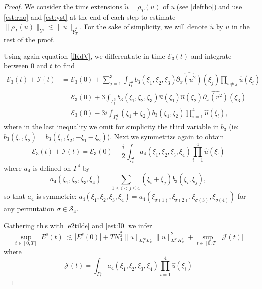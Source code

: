\documentclass{amsart}
\theoremstyle{definition}
\theoremstyle{remark}
\numberwithin{equation}{section}
\begin{document}
\begin{proof}
We consider the time extensions $\widetilde{u} = \rho_T(u)$ of $u$  (see \eqref{defrho}) and use \eqref{est:rho} and \eqref{est:yst} at the end of each step to estimate $\|\rho_{T}(u)\|_{Y^s} \lesssim\|u\|_{\widetilde{Y}^s_T} $.  For the sake of simplicity, we will denote $\widetilde{u}$ by $u$ in the rest of the proof. 

 Using again equation \eqref{fKdV}, we differentiate in time $\mathcal{E}_3(t)$ and integrate between $0$ and $t$ to find
\begin{align*}
\mathcal{E}_3(t) + \mathcal{I}(t) &= \mathcal{E}_3(0) + \sum_{j=1}^3 \int_{\Gamma^3_t} b_3(\xi_1,\xi_2,\xi_3) \widehat{\partial_x(u^2)}(\xi_j) \prod_{i\neq j}\widehat{u}(\xi_i) \\
&= \mathcal{E}_3(0) + 3\int_{\Gamma^3_t}b_3(\xi_1,\xi_2,\xi_3) \widehat{u}(\xi_1) \widehat{u}(\xi_2) \widehat{\partial_x(u^2)}(\xi_3) \\
&= \mathcal{E}_3(0) -3i\int_{\Gamma^4_t} (\xi_1+\xi_2)b_3(\xi_1,\xi_2) \prod_{i=1}^4 \widehat{u}(\xi_i),
\end{align*}
where in the last inequality we omit for simplicity the third variable in $b_3$ (ie: $b_3(\xi_1,\xi_2) = b_3(\xi_1,\xi_2,-\xi_1-\xi_2)$). Next we symmetrize again to obtain
$$
\mathcal{E}_3(t) + \mathcal{I}(t) = \mathcal{E}_3(0) -\frac i2 \int_{\Gamma^4_t} a_4(\xi_1,\xi_2,\xi_3,\xi_4) \prod_{i=1}^4 \widehat{u}(\xi_i)
$$
where $a_4$ is defined on $\Gamma^4$ by
$$
a_4(\xi_1,\xi_2,\xi_3,\xi_4) = \sum_{1 \le i<j \le 4} (\xi_i+\xi_j)b_3(\xi_i,\xi_j),
$$
so that $a_4$ is symmetric: $a_4(\xi_1,\xi_2,\xi_3,\xi_4) = a_4(\xi_{\sigma(1)}, \xi_{\sigma(2)}, \xi_{\sigma(3)}, \xi_{\sigma(4)})$ for any permutation $\sigma\in \mathcal{S}_4$. 

Gathering this with \eqref{e2tilde} and \eqref{est:I0} we infer
$$
\sup_{t\in[0,T]}|E^s(t)| \lesssim |E^s(0)| + T N_0^{\frac 32}\|u\|_{L^\infty_TL^2_x}\|u\|_{L^\infty_TH^s_x}^2 + \sup_{t\in[0,T]} |\mathcal{J}(t)|
$$
where 
\begin{equation} \label{def:J}
\mathcal{J}(t) =  \int_{\Gamma^4_t} a_4(\xi_1,\xi_2,\xi_3,\xi_4) \prod_{i=1}^4 \widehat{u}(\xi_i)
\end{equation}


\end{proof}
\end{document}
